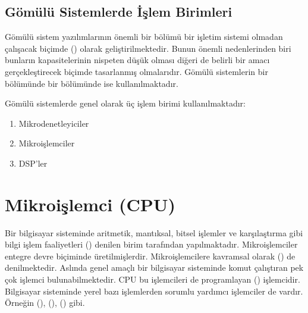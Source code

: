 \documentclass[letterpaper,10pt,turkish]{sphinxmanual}
\begin{document}
\subsection{Gömülü Sistemlerde İşlem Birimleri}
\label{\detokenize{introduction:gomulu-sistemlerde-islem-birimleri}}
\sphinxAtStartPar
Gömülü sistem yazılımlarının önemli bir bölümü bir işletim sistemi olmadan çalışacak biçimde
() olarak geliştirilmektedir. Bunun önemli nedenlerinden biri bunların kapasitelerinin
nispeten düşük olması diğeri de belirli bir amacı gerçekleştirecek biçimde tasarlanmış olmalarıdır.
Gömülü sistemlerin bir bölümünde  bir bölümünde ise  kullanılmaktadır.

\sphinxAtStartPar
Gömülü sistemlerde genel olarak üç işlem birimi kullanılmaktadır:
\begin{enumerate}
%
\item {} 
\sphinxAtStartPar
Mikrodenetleyiciler

\item {} 
\sphinxAtStartPar
Mikroişlemciler

\item {} 
\sphinxAtStartPar
DSP’ler

\end{enumerate}


\section{Mikroişlemci (CPU)}
\label{\detokenize{introduction:mikroislemci-cpu}}
\sphinxAtStartPar
Bir bilgisayar sisteminde aritmetik, mantıksal, bitsel işlemler ve karşılaştırma gibi bilgi işlem
faaliyetleri  () denilen birim tarafından yapılmaktadır.
Mikroişlemciler entegre devre biçiminde üretilmişlerdir. Mikroişlemcilere kavramsal olarak
 () de denilmektedir. Aslında genel amaçlı bir bilgisayar sisteminde
komut çalıştıran pek çok işlemci bulunabilmektedir. CPU bu işlemcileri de programlayan 
() işlemcidir. Bilgisayar sisteminde yerel bazı işlemlerden sorumlu yardımcı işlemciler de
vardır. Örneğin  (), 
(),  () gibi.
\end{document}

